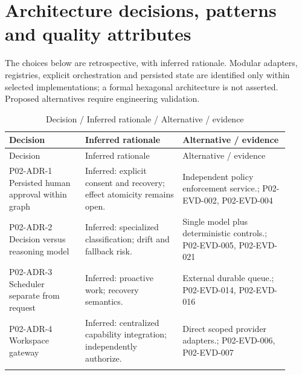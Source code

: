 \documentclass[10pt,letterpaper]{article}
\begin{document}
\section{Architecture decisions, patterns and quality attributes}
The choices below are retrospective, with inferred rationale. Modular adapters, registries, explicit orchestration and persisted state are identified only within selected implementations; a formal hexagonal architecture is not asserted. Proposed alternatives require engineering validation.
\begin{longtable}{@{}>{\raggedright\arraybackslash}p{0.25\linewidth}>{\raggedright\arraybackslash}p{0.32\linewidth}>{\raggedright\arraybackslash}p{0.35\linewidth}@{}}
\caption{Decision / Inferred rationale / Alternative / evidence}\\
\toprule Decision & Inferred rationale & Alternative / evidence\\\midrule\endfirsthead
\toprule Decision & Inferred rationale & Alternative / evidence\\\midrule\endhead
P02-ADR-1 Persisted human approval within graph & Inferred: explicit consent and recovery; effect atomicity remains open. & Independent policy enforcement service.; P02-EVD-002, P02-EVD-004\\\addlinespace
P02-ADR-2 Decision versus reasoning model & Inferred: specialized classification; drift and fallback risk. & Single model plus deterministic controls.; P02-EVD-005, P02-EVD-021\\\addlinespace
P02-ADR-3 Scheduler separate from request & Inferred: proactive work; recovery semantics. & External durable queue.; P02-EVD-014, P02-EVD-016\\\addlinespace
P02-ADR-4 Workspace gateway & Inferred: centralized capability integration; independently authorize. & Direct scoped provider adapters.; P02-EVD-006, P02-EVD-007\\\addlinespace
\bottomrule\end{longtable}
\end{document}
